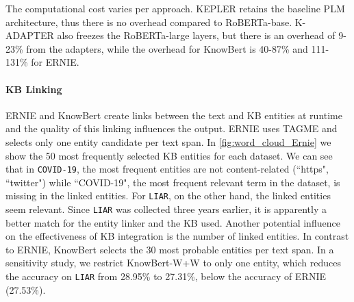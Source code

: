 \documentclass[letterpaper]{article} %
\begin{document}
The computational cost varies per approach.
KEPLER retains the baseline PLM architecture, thus there is no overhead compared to RoBERTa-base.
K-ADAPTER also freezes the RoBERTa-large layers, but there is an overhead of 9-23\% from the adapters, while the overhead for KnowBert is 40-87\% and 111-131\% for ERNIE.

\paragraph{KB Linking}
ERNIE and KnowBert create links between the text and KB entities at runtime and the quality of this linking influences the output.
ERNIE uses TAGME and selects only one entity candidate per text span.
In \autoref{fig:word_cloud_Ernie} we show the 50  most frequently selected KB entities for each dataset.
We can see that in \texttt{COVID-19}, the most frequent entities are not content-related (``https", ``twitter") while ``COVID-19", the most frequent relevant term in the dataset, is missing in the linked entities.
For \texttt{LIAR}, on the other hand, the linked entities seem relevant.
Since \texttt{LIAR} was collected three years earlier, it is apparently a better match for the entity linker and the KB used.
Another potential influence on the effectiveness of KB integration is the number of linked entities.
In contrast to ERNIE, KnowBert selects the 30 most probable entities per text span.
In a sensitivity study, we restrict KnowBert-W+W to only one entity, which reduces the accuracy on \texttt{LIAR} from 28.95\% to 27.31\%, below the accuracy of ERNIE (27.53\%).
\end{document}
